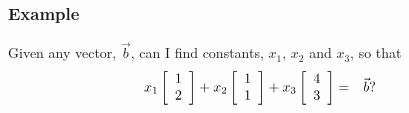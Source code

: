 {\begin{frame}
{  %


        \vfill


    }\fi
  

\end{frame}
}

%  
%
%

\begin{frame}
  \frametitle{Example}

  Given any vector, $\vec{b}$, can I find constants, $x_1$, $x_2$ and
  $x_3$, so that
  \begin{eqnarray*}
    x_1 \left[ \begin{array}{r} 1 \\ 2 \end{array} \right] + x_2 \left[ \begin{array}{r} 1 \\ 1 \end{array} \right]  + x_3 \left[ \begin{array}{r} 4 \\ 3 \end{array} \right] & = & \vec{b}?
  \end{eqnarray*}  

\end{frame}

